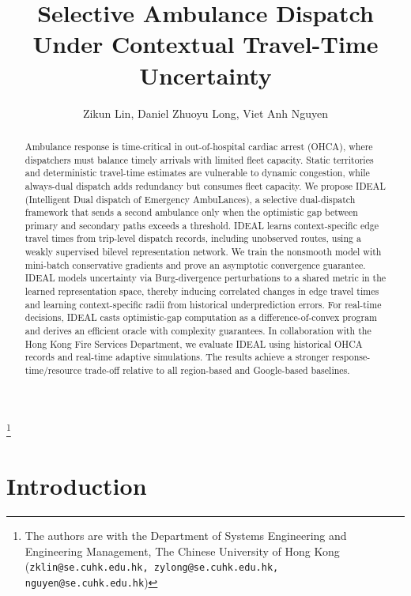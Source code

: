 \documentclass[11pt, letterpaper, oneside, reqno]{amsart}
\begin{document}
\onehalfspacing

\title{Selective Ambulance Dispatch Under Contextual Travel-Time Uncertainty}

\author{
Zikun Lin, 
Daniel Zhuoyu Long,
Viet Anh Nguyen
}
\thanks{\small The authors are with the Department of Systems Engineering and Engineering Management, The Chinese University of Hong Kong (\texttt{zklin@se.cuhk.edu.hk, zylong@se.cuhk.edu.hk, nguyen@se.cuhk.edu.hk})}

\begin{abstract}
Ambulance response is time-critical in out-of-hospital cardiac arrest (OHCA), where dispatchers must balance timely arrivals with limited fleet capacity. Static territories and deterministic travel-time estimates are vulnerable to dynamic congestion, while always-dual dispatch adds redundancy but consumes fleet capacity. We propose IDEAL (Intelligent Dual dispatch of Emergency AmbuLances), a selective dual-dispatch framework that sends a second ambulance only when the optimistic gap between primary and secondary paths exceeds a threshold. IDEAL learns context-specific edge travel times from trip-level dispatch records, including unobserved routes, using a weakly supervised bilevel representation network. We train the nonsmooth model with mini-batch conservative gradients and prove an asymptotic convergence guarantee. IDEAL models uncertainty via Burg-divergence perturbations to a shared metric in the learned representation space, thereby inducing correlated changes in edge travel times and learning context-specific radii from historical underprediction errors. For real-time decisions, IDEAL casts optimistic-gap computation as a difference-of-convex program and derives an efficient oracle with complexity guarantees. In collaboration with the Hong Kong Fire Services Department, we evaluate IDEAL using historical OHCA records and real-time adaptive simulations. The results achieve a stronger response-time/resource trade-off relative to all region-based and Google-based baselines.
\end{abstract}


\maketitle
\thispagestyle{firstpage}


\section{Introduction}\label{sec:introduction}
\end{document}
